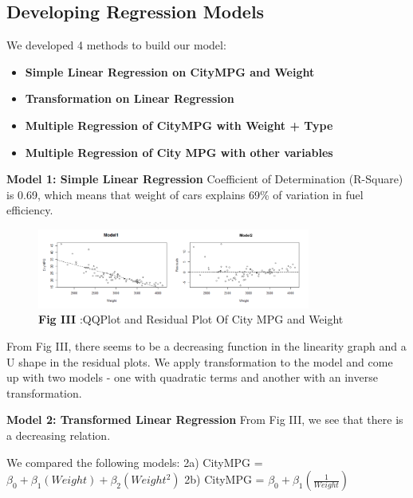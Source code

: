 \documentclass[12pt]{article}
\begin{document}
\subsection{Developing Regression Models}
We developed 4 methods to build our model: 
\begin{itemize}
\item \textbf{Simple Linear Regression on CityMPG and Weight}

\item \textbf{Transformation on Linear Regression}

\item \textbf{Multiple Regression of CityMPG with Weight + Type}

\item \textbf{Multiple Regression of City MPG with other variables}
\end{itemize}
\textbf{Model 1: Simple Linear Regression} \newline
Coefficient of Determination (R-Square) is 0.69, which means that weight of cars explains 69\% of variation in fuel efficiency.

\begin{figure}[!htb]
	\caption*{\textbf{Fig III }:{QQPlot and Residual Plot Of City MPG and Weight}}
	\begin{center}
	\includegraphics[width=0.8\textwidth]{Residual.png}
	\end{center}
\end{figure}

From Fig III, there seems to be a decreasing function in the linearity graph and a U shape in the  residual plots. 
We apply transformation to the model and come up with two models - one with quadratic terms and another with an inverse transformation.


\textbf{Model 2: Transformed Linear Regression} \newline
From Fig III, we see that there is a decreasing relation. 


We compared the following models: \newline
2a) CityMPG = $\beta_0 + \beta_1(Weight) + \beta_2(Weight^{2})$ \newline
2b) CityMPG = $\beta_0 + \beta_1(\frac{1}{Weight})$ 
\end{document}
